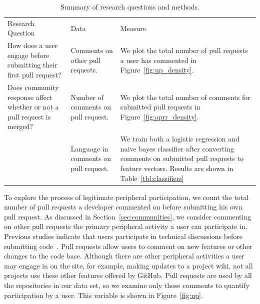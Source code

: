 \documentclass{iitthesis}
\begin{document}
\begin{table} \centering
\caption{Summary of research questions and methods.}
\label{tbl:research_questions}
\begin{tabular}{ p{3in} p{3in} p{2in} }
\hline\hline
Research Question
& Data                                  & Measure
\\
How does a user engage before submitting their first pull request?
& Comments on other pull requests.      & We plot the total number
of pull requests a user has commented in
Figure~\ref{fig:up_density}.
\\
Does community response affect whether or not a pull request is
merged? & Number of comments on pull request.   & We plot the
total number of comments for submitted pull requests in
Figure~\ref{fig:aprr_density}.
\\
~
& Language in comments on pull request. & We train both a
logistic regression and naive bayes classifier after
converting comments on submitted pull requests to feature
vectors. Results are shown in
Table~\ref{tbl:classifiers} \\
\hline
\end{tabular}
\end{table}

To explore the process of legitimate peripheral participation, we count the
total number of pull requests a developer commented on before submitting his own
pull request. As discussed in Section~\ref{sec:communities}, we consider
commenting on other pull requests the primary peripheral activity a user can
participate in. Previous studies indicate that users participate in technical
discussions before submitting code~\cite{von_krogh_community_2003}. Pull
requests allow users to comment on new features or other changes to the code
base. Although there are other peripheral activities a user may engage in on the
site, for example, making updates to a project wiki, not all projects use these
other features offered by GitHub. Pull requests are used by all the repositories
in our data set, so we examine only those comments to quantify participation by
a user. This variable is shown in Figure~\ref{fig:up}.
\end{document}
